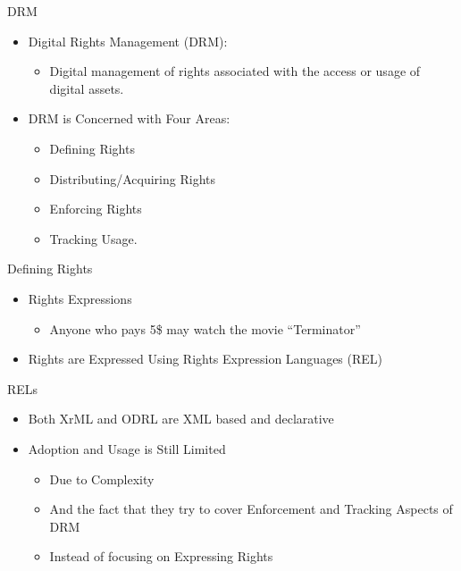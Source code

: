 \documentclass{beamer}
\begin{document}
\begin{frame}{DRM}
\begin{itemize}
   \item Digital Rights Management (DRM):
   \begin{itemize}
      \item Digital management of rights associated with the access or usage of digital assets.
   \end{itemize}
   \item DRM is Concerned with Four Areas:
     \begin{itemize}
	\item Defining Rights
	\item Distributing/Acquiring Rights
	\item Enforcing Rights
	\item Tracking Usage.
     \end{itemize}
\end{itemize}
\end{frame}
\begin{frame}[fragile]{Defining Rights}
\LARGE
\begin{itemize}
\item Rights Expressions
   \begin{itemize}
   \item Anyone who pays 5\$ may watch the movie ``Terminator''
   \end{itemize}
\item Rights are Expressed Using Rights Expression Languages (REL)
\end{itemize}
\end{frame}
\begin{frame}[fragile]{RELs}
\LARGE
\begin{itemize}
\item Both XrML and ODRL are XML based and declarative
\item Adoption and Usage is Still Limited
   \begin{itemize}
   \item Due to Complexity 
   \item And the fact that they try to cover Enforcement and Tracking Aspects of DRM
   \item Instead of focusing on Expressing Rights
   \end{itemize}
\end{itemize}
\end{frame}
\end{document}
